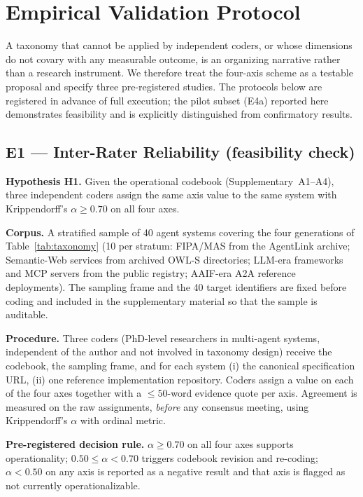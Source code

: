 \documentclass{IEEEcsmag}
\begin{document}
\section{Empirical Validation Protocol}\label{sec:validation}

A taxonomy that cannot be applied by independent coders, or whose dimensions do not covary with any measurable outcome, is an organizing narrative rather than a research instrument.  We therefore treat the four-axis scheme as a testable proposal and specify three pre-registered studies.  The protocols below are registered in advance of full execution; the pilot subset (E4a) reported here demonstrates feasibility and is explicitly distinguished from confirmatory results.

\subsection{E1 --- Inter-Rater Reliability (feasibility check)}

\textbf{Hypothesis H1.} Given the operational codebook (Supplementary \textsection\,A1--A4), three independent coders assign the same axis value to the same system with Krippendorff's $\alpha \geq 0.70$ on all four axes.

\textbf{Corpus.} A stratified sample of 40 agent systems covering the four generations of Table~\ref{tab:taxonomy} (10 per stratum: FIPA/MAS from the AgentLink archive; Semantic-Web services from archived OWL-S directories; LLM-era frameworks and MCP servers from the public registry; AAIF-era A2A reference deployments).  The sampling frame and the 40 target identifiers are fixed before coding and included in the supplementary material so that the sample is auditable.

\textbf{Procedure.}  Three coders (PhD-level researchers in multi-agent systems, independent of the author and not involved in taxonomy design) receive the codebook, the sampling frame, and for each system (i) the canonical specification URL, (ii) one reference implementation repository.  Coders assign a value on each of the four axes together with a $\leq 50$-word evidence quote per axis.  Agreement is measured on the raw assignments, \emph{before} any consensus meeting, using Krippendorff's $\alpha$ with ordinal metric.

\textbf{Pre-registered decision rule.}  $\alpha \geq 0.70$ on all four axes supports operationality; $0.50 \leq \alpha < 0.70$ triggers codebook revision and re-coding; $\alpha < 0.50$ on any axis is reported as a negative result and that axis is flagged as not currently operationalizable.
\end{document}
